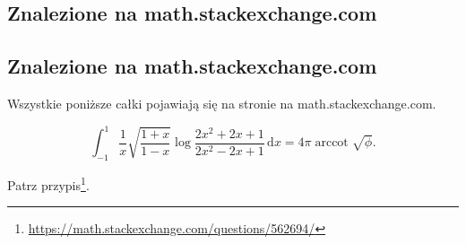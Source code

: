 %

\subsection{Znalezione na math.stackexchange.com}
\subsection{Znalezione na math.stackexchange.com} %
Wszystkie poniższe całki pojawiają się na stronie na math.stackexchange.com.

\begin{problem}[pytanie 562694]
    \label{stack_562694}%
    \begin{equation}
        \int_{-1}^1 \frac{1}{x} \sqrt{\frac{1+x}{1-x}} \log \frac{2x^2+2x+1}{2x^2-2x+1} \,\mathrm{d}x = 4 \pi \operatorname{arccot} \sqrt{\phi}.
    \end{equation}
\end{problem}

\begin{solution} %
    Patrz przypis\footnote{\url{https://math.stackexchange.com/questions/562694/}}. %
\end{solution} %


%